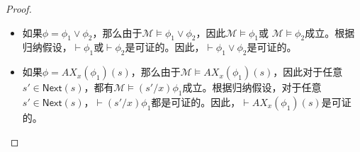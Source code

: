 \begin{proof}
\begin{itemize}
		
		\item 如果$\phi = \phi_1\vee\phi_2$，那么由于$\mathcal{M}\models \phi_1\vee\phi_2$，因此$\mathcal{M}\models \phi_1$或 $\mathcal{M}\models \phi_2$成立。根据归纳假设，$\vdash \phi_1$或$\vdash \phi_2$是可证的。因此，$\vdash \phi_1\vee\phi_2$是可证的。
		
		
		\item 如果$\phi = AX_x(\phi_1)(s)$，那么由于$\mathcal{M}\models AX_x(\phi_1)(s)$，因此对于任意$s'\in \mathsf{Next}(s)$，都有$\mathcal{M}\models (s'/x)\phi_1$成立。根据归纳假设，对于任意$s'\in \mathsf{Next}(s)$，$\vdash (s'/x)\phi_1$都是可证的。因此，$\vdash AX_x(\phi_1)(s)$是可证的。
		
		

\end{itemize}
\end{proof}
